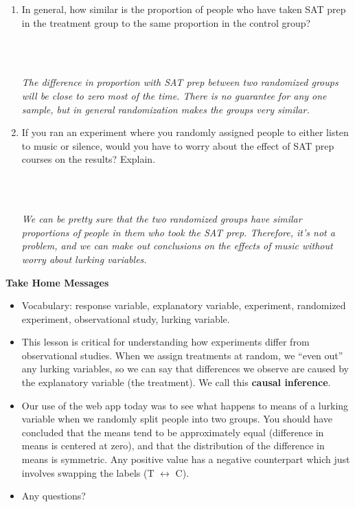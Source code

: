 \begin{enumerate}
\item In general, how similar is the proportion of people who have
  taken SAT prep in the treatment group to the same proportion in the
  control group? 
\begin{students}
        \vspace{3cm}\\
\end{students}
\begin{key}
  \\ {\it  The difference in proportion with SAT prep between two
    randomized groups will be close to zero most of the time.  There
    is no guarantee for any one sample, but in general randomization
    makes the groups very similar.} 
\end{key}
\item If you ran an experiment where you randomly assigned people to
  either listen to music or silence, would you have to worry about the effect
  of SAT prep courses on the results?  Explain. 
\begin{students}
        \vspace{\fill}\\
\end{students}
\begin{key}
  \\ {\it We can be pretty sure that the two randomized groups have
    similar proportions of people in them who took the SAT prep.
    Therefore, it's not a problem, and we can make out conclusions on
    the effects of music without worry about lurking variables.}
\end{key} 
\end{enumerate}


\begin{center}
  {\bf Take Home Messages}
\end{center}
  \begin{itemize}
  \item Vocabulary:  response variable, explanatory variable,
    experiment, randomized experiment, observational study, lurking
    variable.
  \item This lesson is critical for understanding how experiments
    differ from observational studies.  When we assign treatments at
    random, we ``even out'' any lurking variables, so we can say that
    differences we observe are caused by the explanatory variable (the
    treatment). We call this {\bf causal inference}.
  \item  Our use of the web app today was to see what happens to means
    of a lurking variable when we randomly split people into two
    groups. You should have concluded that the means tend to be
    approximately equal (difference in means is centered at zero), and
    that the distribution of the difference in means is symmetric. Any
    positive value has a negative counterpart which just involves
    swapping the labels (T $\longleftrightarrow$ C).

 \item 
  Any questions? 
  \end{itemize}


